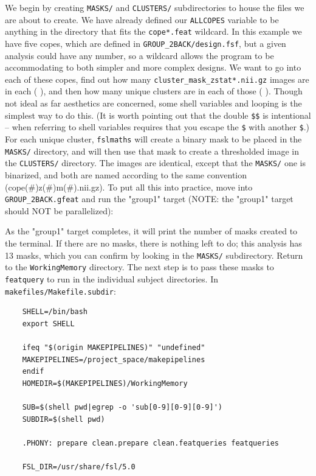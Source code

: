 We begin by creating \texttt{MASKS/} and \texttt{CLUSTERS/} subdirectories to house the files we are about to create.  We have already defined our \texttt{ALLCOPES} variable to be anything in the directory that fits the \texttt{cope*.feat} wildcard. In this example we have five copes, which are defined in \texttt{GROUP_2BACK/design.fsf}, but a given analysis could have any number, so a wildcard allows the program to be accommodating to both simpler and more complex designs.  We want \maken{} to go into each of these copes, find out how many \texttt{cluster_mask_zstat*.nii.gz} images are in each ( ), and then how many unique clusters are in each of those ( ). Though not ideal as far aesthetics are concerned, some shell variables and looping is the simplest way to do this.  (It is worth pointing out that the double \texttt{\$\$} is intentional -- when referring to shell variables \maken{} requires that you escape the \texttt{\$} with another \texttt{\$}.) For each unique cluster, \texttt{fslmaths} will create a binary mask to be placed in the \texttt{MASKS/} directory, and will then use that mask to create a thresholded image in the \texttt{CLUSTERS/} directory. The images are identical, except that the \texttt{MASKS/} one is binarized, and both are named according to the same convention (cope(\#)z(\#)m(\#).nii.gz). To put all this into practice, move into \texttt{GROUP_2BACK.gfeat} and run the "group1" target (NOTE: the "group1" target should NOT be parallelized):

As the "group1" target completes, it will print the number of masks created to the terminal. If there are no masks, there is nothing left to do; this analysis has 13 masks, which you can confirm by looking in the \texttt{MASKS/} subdirectory. Return to the \texttt{WorkingMemory} directory. The next step is to pass these masks to \texttt{featquery} to run in the individual subject directories. In \texttt{makefiles/Makefile.subdir}:

\begin{lstlisting}
	SHELL=/bin/bash
	export SHELL
	
	ifeq "$(origin MAKEPIPELINES)" "undefined"
	MAKEPIPELINES=/project_space/makepipelines
	endif
	HOMEDIR=$(MAKEPIPELINES)/WorkingMemory
	
	SUB=$(shell pwd|egrep -o 'sub[0-9][0-9][0-9]')
	SUBDIR=$(shell pwd)
	
	.PHONY: prepare clean.prepare clean.featqueries featqueries

	FSL_DIR=/usr/share/fsl/5.0
\end{lstlisting}

